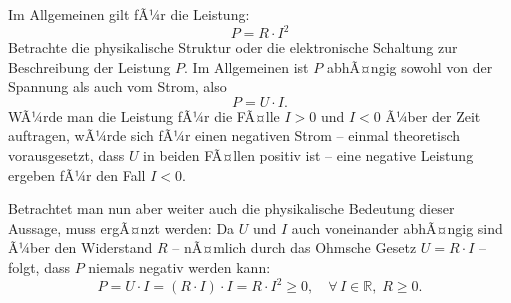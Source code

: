 ﻿\documentclass[12pt, a4paper]{article}
\begin{document}
	Im Allgemeinen gilt fÃ¼r die Leistung:
	\begin{equation}
		P = R \cdot I^2
		\label{eq:leistung_R}
	\end{equation}
	Betrachte die physikalische Struktur oder die elektronische Schaltung zur Beschreibung der Leistung $P$. Im Allgemeinen ist $P$ abhÃ¤ngig sowohl von der Spannung als auch vom Strom, also
	\begin{equation}
		P = U \cdot I.
		\label{eq:leistung_UI}
	\end{equation}
	WÃ¼rde man die Leistung fÃ¼r die FÃ¤lle $I > 0$ und $I < 0$ Ã¼ber der Zeit auftragen, wÃ¼rde sich fÃ¼r einen negativen Strom -- einmal theoretisch vorausgesetzt, dass $U$ in beiden FÃ¤llen positiv ist -- eine negative Leistung ergeben fÃ¼r den Fall $I < 0$.
	
	Betrachtet man nun aber weiter auch die physikalische Bedeutung dieser Aussage, muss ergÃ¤nzt werden: Da $U$ und $I$ auch voneinander abhÃ¤ngig sind Ã¼ber den Widerstand $R$ -- nÃ¤mlich durch das Ohmsche Gesetz $U = R \cdot I$ -- folgt, dass $P$ niemals negativ werden kann:
	\begin{equation}
		P = U \cdot I = (R \cdot I) \cdot I = R \cdot I^2 \geq 0,
		\quad \forall\, I \in \mathbb{R},\; R \geq 0.
	\end{equation}
	
\end{document}
